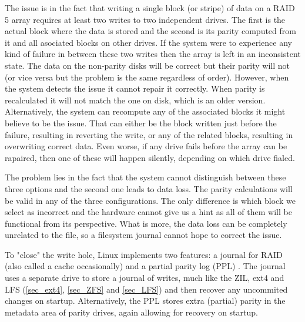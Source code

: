         The issue is in the fact that writing a single block (or stripe) of
        data on a RAID 5 array requires at least two writes to two independent
        drives. The first is the actual block where the data is stored and the
        second is its parity computed from it and all asociated blocks on other
        drives. If the system were to experience any kind of failure in between
        these two writes then the array is left in an inconsistent state. The
        data on the non-parity disks will be correct but their parity will not
        (or vice versa but the problem is the same regardless of order).
        However, when the system detects the issue it cannot repair it
        correctly. When parity is recalculated it will not match the one on
        disk, which is an older version. Alternatively, the system can
        recompute any of the associated blocks it might believe to be the
        issue. That can either be the block written just before the failure,
        resulting in reverting the write, or any of the related blocks,
        resulting in overwriting correct data. Even worse, if any drive fails
        before the array can be rapaired, then one of these will happen
        silently, depending on which drive fialed.

        The problem lies in the fact that the system cannot distinguish between
        these three options and the second one leads to data loss. The parity
        calculations will be valid in any of the three configurations. The only
        difference is which block we select as incorrect and the hardware
        cannot give us a hint as all of them will be functional from its
        perspective. What is more, the data loss can be completely unrelated to
        the file, so a filesystem journal cannot hope to correct the issue.


        To "close" the write hole, Linux implements two features: a journal for
        RAID \cite{LWN_md_journal} (also called a cache occasionally) and a
        partial parity log (PPL) \cite{partial_parity_log}. The journal uses a
        separate drive to store a journal of writes, much like the ZIL, ext4
        and LFS (\ref{sec_ext4}, \ref{sec_ZFS} and \ref{sec_LFS}) and then
        recover any uncommited changes on startup. Alternatively, the PPL
        stores extra (partial) parity in the metadata area of parity drives,
        again allowing for recovery on startup.

